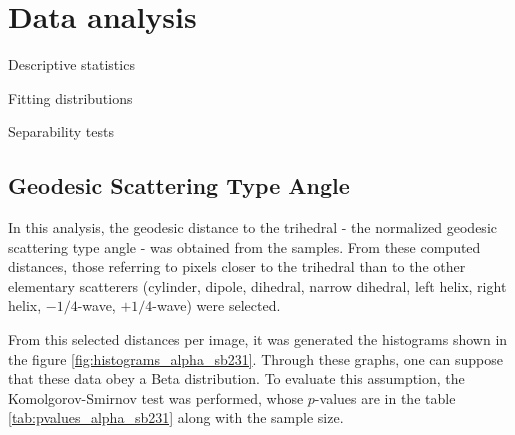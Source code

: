 \documentclass[journal]{IEEEtran}
\begin{document}



\section{Data analysis}

Descriptive statistics

Fitting distributions

Separability tests


\subsection{Geodesic Scattering Type Angle}

In this analysis, the geodesic distance to the trihedral - the normalized geodesic scattering type angle - was obtained from the samples. From these computed distances, those referring to pixels closer to the trihedral than to the other elementary scatterers (cylinder, dipole, dihedral, narrow dihedral, left helix, right helix, $-1/4$-wave, $+1/4$-wave) were selected.

From this selected distances per image, it was generated the histograms shown in the figure \ref{fig:histograms_alpha_sb231}. Through these graphs, one can suppose that these data obey a Beta distribution. To evaluate this assumption, the Komolgorov-Smirnov test was performed, whose $p$-values are in the table \ref{tab:pvalues_alpha_sb231} along with the sample size.
\end{document}
